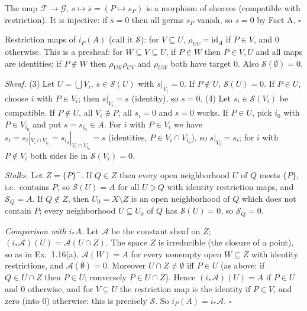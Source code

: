 \documentclass[11pt]{article}
\begin{document}
The map $\mathcal F\to\mathcal G$, $s\mapsto\bar s=(P\mapsto s_P)$ is a morphism of sheaves (compatible with restriction). It is injective: if $\bar s=0$ then all germs $s_P$ vanish, so $s=0$ by Fact A. \hfill$\square$

\pf
Restriction maps of $i_P(A)$ (call it $\mathcal S$): for $V\subseteq U$, $\rho_{UV}=\mathrm{id}_A$ if $P\in V$, and $0$ otherwise. This is a presheaf: for $W\subseteq V\subseteq U$, if $P\in W$ then $P\in V,U$ and all maps are identities; if $P\notin W$ then $\rho_{VW}\rho_{UV}$ and $\rho_{UW}$ both have target $0$. Also $\mathcal S(\emptyset)=0$.

\emph{Sheaf.} (3) Let $U=\bigcup V_i$, $s\in\mathcal S(U)$ with $s|_{V_i}=0$. If $P\notin U$, $\mathcal S(U)=0$. If $P\in U$, choose $i$ with $P\in V_i$; then $s|_{V_i}=s$ (identity), so $s=0$. (4) Let $s_i\in\mathcal S(V_i)$ be compatible. If $P\notin U$, all $V_i\not\ni P$, all $s_i=0$ and $s=0$ works. If $P\in U$, pick $i_0$ with $P\in V_{i_0}$ and put $s=s_{i_0}\in A$. For $i$ with $P\in V_i$ we have $s_i=s_i|_{V_i\cap V_{i_0}}=s_{i_0}|_{V_i\cap V_{i_0}}=s$ (identities, $P\in V_i\cap V_{i_0}$), so $s|_{V_i}=s_i$; for $i$ with $P\notin V_i$ both sides lie in $\mathcal S(V_i)=0$.

\emph{Stalks.} Let $Z=\{P\}^-$. If $Q\in Z$ then every open neighborhood $U$ of $Q$ meets $\{P\}$, i.e.\ contains $P$, so $\mathcal S(U)=A$ for all $U\ni Q$ with identity restriction maps, and $\mathcal S_Q=A$. If $Q\notin Z$, then $U_0=X\setminus Z$ is an open neighborhood of $Q$ which does not contain $P$; every neighborhood $U\subseteq U_0$ of $Q$ has $\mathcal S(U)=0$, so $\mathcal S_Q=0$.

\emph{Comparison with $i_*A$.} Let $\mathcal A$ be the constant sheaf on $Z$; $(i_*\mathcal A)(U)=\mathcal A(U\cap Z)$. The space $Z$ is irreducible (the closure of a point), so as in Ex.~1.16(a), $\mathcal A(W)=A$ for every nonempty open $W\subseteq Z$ with identity restrictions, and $\mathcal A(\emptyset)=0$. Moreover $U\cap Z\ne\emptyset$ iff $P\in U$ (as above: if $Q\in U\cap Z$ then $P\in U$; conversely $P\in U\cap Z$). Hence $(i_*\mathcal A)(U)=A$ if $P\in U$ and $0$ otherwise, and for $V\subseteq U$ the restriction map is the identity if $P\in V$, and zero (into $0$) otherwise: this is precisely $\mathcal S$. So $i_P(A)=i_*\mathcal A$. \hfill$\square$
\end{document}
